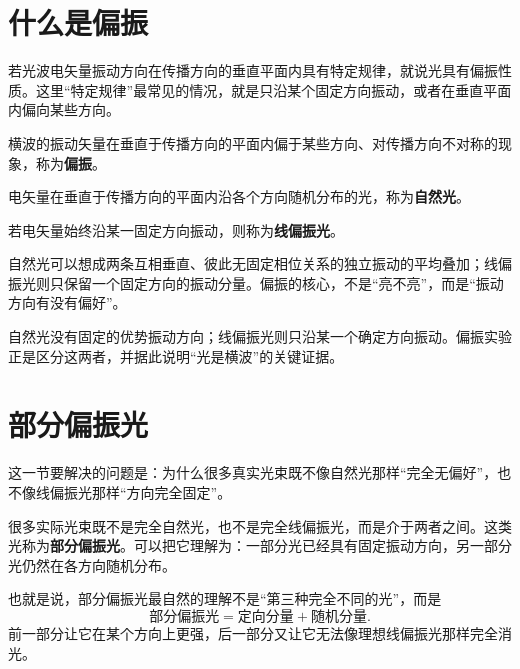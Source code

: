 \documentclass[lang=cn,11pt]{elegantbook}
\begin{document}
\section{什么是偏振}

若光波电矢量振动方向在传播方向的垂直平面内具有特定规律，就说光具有偏振性质。这里“特定规律”最常见的情况，就是只沿某个固定方向振动，或者在垂直平面内偏向某些方向。

\begin{definition}[偏振]\label{def:polarization}
横波的振动矢量在垂直于传播方向的平面内偏于某些方向、对传播方向不对称的现象，称为\textbf{偏振}。
\end{definition}

\begin{definition}[自然光]\label{def:natural-light}
电矢量在垂直于传播方向的平面内沿各个方向随机分布的光，称为\textbf{自然光}。
\end{definition}

\begin{definition}[线偏振光]\label{def:linearly-polarized-light}
若电矢量始终沿某一固定方向振动，则称为\textbf{线偏振光}。
\end{definition}

\begin{note}
自然光可以想成两条互相垂直、彼此无固定相位关系的独立振动的平均叠加；线偏振光则只保留一个固定方向的振动分量。偏振的核心，不是“亮不亮”，而是“振动方向有没有偏好”。
\end{note}

\begin{note}
自然光没有固定的优势振动方向；线偏振光则只沿某一个确定方向振动。偏振实验正是区分这两者，并据此说明“光是横波”的关键证据。
\end{note}

\section{部分偏振光}

这一节要解决的问题是：为什么很多真实光束既不像自然光那样“完全无偏好”，也不像线偏振光那样“方向完全固定”。

很多实际光束既不是完全自然光，也不是完全线偏振光，而是介于两者之间。这类光称为\textbf{部分偏振光}。可以把它理解为：一部分光已经具有固定振动方向，另一部分光仍然在各方向随机分布。

也就是说，部分偏振光最自然的理解不是“第三种完全不同的光”，而是
\[
\text{部分偏振光}=\text{定向分量}+\text{随机分量}.
\]
前一部分让它在某个方向上更强，后一部分又让它无法像理想线偏振光那样完全消光。
\end{document}
